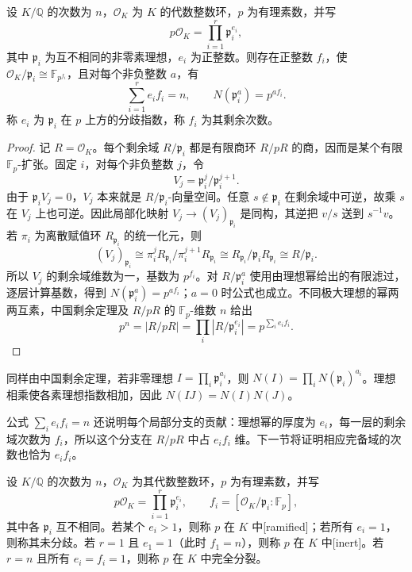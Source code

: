 \begin{proposition}\label{b3:prop:prime-decomposition-degree}
	设 \(K/\mathbb Q\) 的次数为 \(n\)，\(\mathcal O_K\) 为 \(K\) 的代数整数环，\(p\) 为有理素数，并写
	\[
		p\mathcal O_K=\prod_{i=1}^r\mathfrak p_i^{e_i},
	\]
	其中 \(\mathfrak p_i\) 为互不相同的非零素理想，\(e_i\) 为正整数。则存在正整数 \(f_i\)，使 \(\mathcal O_K/\mathfrak p_i\cong\mathbb F_{p^{f_i}}\)，且对每个非负整数 \(a\)，有
	\[
		\sum_{i=1}^r e_if_i=n,\qquad N(\mathfrak p_i^a)=p^{af_i}.
	\]
	称 \(e_i\) 为 \(\mathfrak p_i\) 在 \(p\) 上方的分歧指数，称 \(f_i\) 为其剩余次数。
\end{proposition}
\begin{proof}
	记 \(R=\mathcal O_K\)。每个剩余域 \(R/\mathfrak p_i\) 都是有限商环 \(R/pR\) 的商，因而是某个有限 \(\mathbb F_p\)-扩张。固定 \(i\)，对每个非负整数 \(j\)，令
	\[
		V_j=\mathfrak p_i^j/\mathfrak p_i^{j+1}.
	\]
	由于 \(\mathfrak p_iV_j=0\)，\(V_j\) 本来就是 \(R/\mathfrak p_i\)-向量空间。任意 \(s\notin\mathfrak p_i\) 在剩余域中可逆，故乘 \(s\) 在 \(V_j\) 上也可逆。因此局部化映射 \(V_j\rightarrow(V_j)_{\mathfrak p_i}\) 是同构，其逆把 \(v/s\) 送到 \(s^{-1}v\)。若 \(\pi_i\) 为离散赋值环 \(R_{\mathfrak p_i}\) 的统一化元，则
	\[
		(V_j)_{\mathfrak p_i} \cong\pi_i^jR_{\mathfrak p_i}/\pi_i^{j+1}R_{\mathfrak p_i} \cong R_{\mathfrak p_i}/\mathfrak p_iR_{\mathfrak p_i} \cong R/\mathfrak p_i.
	\]
	所以 \(V_j\) 的剩余域维数为一，基数为 \(p^{f_i}\)。对 \(R/\mathfrak p_i^a\) 使用由理想幂给出的有限滤过，逐层计算基数，得到 \(N(\mathfrak p_i^a)=p^{af_i}\)；\(a=0\) 时公式也成立。不同极大理想的幂两两互素，中国剩余定理及 \(R/pR\) 的 \(\mathbb F_p\)-维数 \(n\) 给出
	\[
		p^n=|R/pR|=\prod_i|R/\mathfrak p_i^{e_i}|=p^{\sum_i e_if_i}.
	\]
\end{proof}

同样由中国剩余定理，若非零理想 \(I=\prod_i\mathfrak p_i^{a_i}\)，则 \(N(I)=\prod_iN(\mathfrak p_i)^{a_i}\)。理想相乘使各素理想指数相加，因此 \(N(IJ)=N(I)N(J)\)。

公式 \(\sum_i e_if_i=n\) 还说明每个局部分支的贡献：理想幂的厚度为 \(e_i\)，每一层的剩余域次数为 \(f_i\)，所以这个分支在 \(R/pR\) 中占 \(e_if_i\) 维。下一节将证明相应完备域的次数也恰为 \(e_if_i\)。

\begin{definition}\label{b3:def:numberfield-prime-splitting}
	设 \(K/\mathbb Q\) 的次数为 \(n\)，\(\mathcal O_K\) 为其代数整数环，\(p\) 为有理素数，并写
	\[
		p\mathcal O_K=\prod_{i=1}^r\mathfrak p_i^{e_i},\qquad f_i=[\mathcal O_K/\mathfrak p_i:\mathbb F_p],
	\]
	其中各 \(\mathfrak p_i\) 互不相同。若某个 \(e_i>1\)，则称 \(p\) 在 \(K\) 中[ramified]；若所有 \(e_i=1\)，则称其未分歧。若 \(r=1\) 且 \(e_1=1\)（此时 \(f_1=n\)），则称 \(p\) 在 \(K\) 中[inert]。若 \(r=n\) 且所有 \(e_i=f_i=1\)，则称 \(p\) 在 \(K\) 中完全分裂。
\end{definition}

